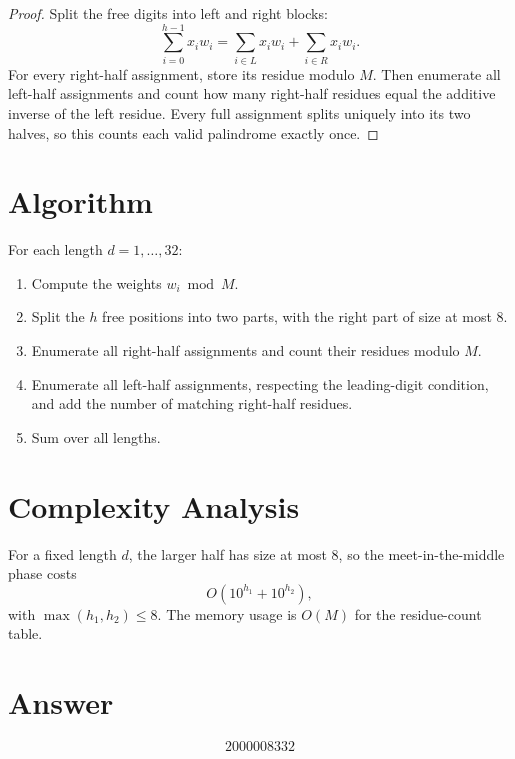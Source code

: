 \documentclass[11pt]{article}
\begin{document}
\begin{proof}
Split the free digits into left and right blocks:
\[
  \sum_{i=0}^{h-1} x_i w_i
  =
  \sum_{i \in L} x_i w_i + \sum_{i \in R} x_i w_i.
\]
For every right-half assignment, store its residue modulo $M$. Then enumerate all left-half assignments and count how many right-half residues equal the additive inverse of the left residue. Every full assignment splits uniquely into its two halves, so this counts each valid palindrome exactly once.
\end{proof}

\section{Algorithm}

For each length $d=1,\dots,32$:
\begin{enumerate}
  \item Compute the weights $w_i \bmod M$.
  \item Split the $h$ free positions into two parts, with the right part of size at most $8$.
  \item Enumerate all right-half assignments and count their residues modulo $M$.
  \item Enumerate all left-half assignments, respecting the leading-digit condition, and add the number of matching right-half residues.
  \item Sum over all lengths.
\end{enumerate}

\section{Complexity Analysis}

For a fixed length $d$, the larger half has size at most $8$, so the meet-in-the-middle phase costs
\[
  O(10^{h_1} + 10^{h_2}),
\]
with $\max(h_1,h_2)\le 8$. The memory usage is $O(M)$ for the residue-count table.

\section{Answer}

\[
\boxed{2000008332}
\]
\end{document}

